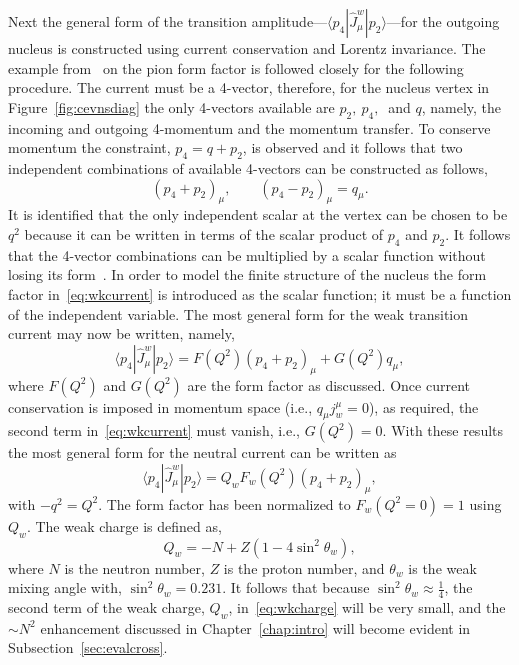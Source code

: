Next the general form of the transition amplitude---$\langle p_4|\hat{J}_{\mu}^{w}|p_2 \rangle$---for the outgoing nucleus is constructed using current conservation and Lorentz invariance. The example from~\cite{aitchison:2003:gauge} on the pion form factor is followed closely for the following procedure. The current must be a 4-vector, therefore, for the nucleus vertex in Figure~\ref{fig:cevnsdiag} the only 4-vectors available are $p_2,\ p_4,\ $ and $q$, namely,  the incoming and outgoing 4-momentum and the momentum transfer. To conserve momentum the constraint, $p_4=q+p_2$, is observed and  it follows that two independent combinations of available 4-vectors can be constructed as follows,
\begin{equation}
\left( p_4+p_2 \right) _{\mu},\qquad
\left( p_4-p_2 \right) _{\mu}=q_{\mu}.
\end{equation}
It is identified that the only independent scalar at the vertex can be chosen to be $q^2$ because it can be written in terms of the scalar product of $p_4$ and $p_2$. It follows that the 4-vector combinations can be multiplied by a scalar function without losing its form~\cite{aitchison:2003:gauge}. In order to model the finite structure of the nucleus the form factor in~\eqref{eq:wkcurrent} is introduced as the scalar function; it must be a function of the independent variable. The most general form for the weak transition current may now be written, namely,
\begin{equation}\label{eq:wkcurrent}
\langle p_4|\hat{J}_{\mu}^{w}|p_2 \rangle = F(Q^2)\left( p_4+p_2 \right) _{\mu}+G(Q^2)q_{\mu},
\end{equation} 
where $F(Q^2)$ and $G(Q^2)$ are the form factor as discussed. Once current conservation is imposed in momentum space (i.e., $q_{\mu}j_{w}^{\mu}=0$), as required, the second term in~\eqref{eq:wkcurrent} must vanish, i.e., $G(Q^2)=0$. With these results the most general form for the neutral current can be written as
\begin{equation}\label{eq:wktrancurrent}
\langle p_4|\hat{J}_{\mu}^{w}|p_2 \rangle = Q_{w}F_{w}(Q^2)\left( p_4+p_2 \right) _{\mu},
\end{equation}
with $-q^2=Q^2$. The form factor has been normalized to $F_{w}(Q^2=0)=1$ using $Q_{w}$. The weak charge is defined as,
\begin{equation}\label{eq:wkcharge}
Q_{w}=-N+Z(1-4\sin ^2\theta _w),
\end{equation}
where $N$ is the neutron number, $Z$ is the proton number, and $\theta _w$ is the weak mixing angle with, $ \sin ^2\theta _w = 0.231$. It follows that because $ \sin^2\theta _w \approx \frac{1}{4} $, the second term of the weak charge, $Q_w$, in~\eqref{eq:wkcharge} will be very small, and the $ \sim N^2 $ enhancement discussed in Chapter~\ref{chap:intro} will become evident in Subsection~\ref{sec:evalcross}. 
 
